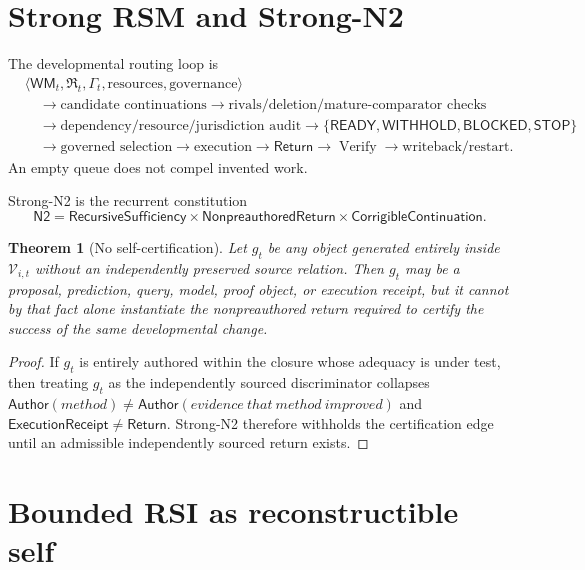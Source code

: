 \documentclass[10pt]{article}
\theoremstyle{venus}
\newtheorem{theorem}{Theorem}
\theoremstyle{definition}
\newcommand{\Verify}{\operatorname{Verify}}
\newcommand{\Ntwo}{\mathsf{N2}}
\newcommand{\WM}{\mathsf{WM}}
\newcommand{\Return}{\mathsf{Return}}
\newcommand{\Author}{\mathsf{Author}}
\newcommand{\Withhold}{\mathsf{WITHHOLD}}
\newcommand{\Stop}{\mathsf{STOP}}
\begin{document}
\section{Strong RSM and Strong-N2}

The developmental routing loop is
\begin{equation}\label{eq:rsm}
\begin{aligned}
&\langle \WM_t,\mathfrak R_t,\Gamma_t,\text{resources},\text{governance}\rangle\\
&\quad\to \text{candidate continuations}
\to \text{rivals/deletion/mature-comparator checks}\\
&\quad\to \text{dependency/resource/jurisdiction audit}
\to \{\mathsf{READY},\Withhold,\mathsf{BLOCKED},\Stop\}\\
&\quad\to \text{governed selection}
\to \text{execution}
\to \Return
\to \Verify
\to \text{writeback/restart}.
\end{aligned}
\end{equation}
An empty queue does not compel invented work.

Strong-N2 is the recurrent constitution
\begin{equation}\label{eq:n2}
\boxed{
\Ntwo
=
\mathsf{RecursiveSufficiency}
\times
\mathsf{NonpreauthoredReturn}
\times
\mathsf{CorrigibleContinuation}.
}
\end{equation}

\begin{theorem}[No self-certification]
Let $g_t$ be any object generated entirely inside $\mathcal V_{i,t}$ without an
independently preserved source relation. Then $g_t$ may be a proposal,
prediction, query, model, proof object, or execution receipt, but it cannot by
that fact alone instantiate the nonpreauthored return required to certify the
success of the same developmental change.
\end{theorem}
\begin{proof}
If $g_t$ is entirely authored within the closure whose adequacy is under test,
then treating $g_t$ as the independently sourced discriminator collapses
\(\Author(method)\neq\Author(evidence\ that\ method\ improved)\) and
\(\mathsf{ExecutionReceipt}\neq\Return\). Strong-N2 therefore withholds the
certification edge until an admissible independently sourced return exists.
\end{proof}

\section{Bounded RSI as reconstructible self}
\end{document}
